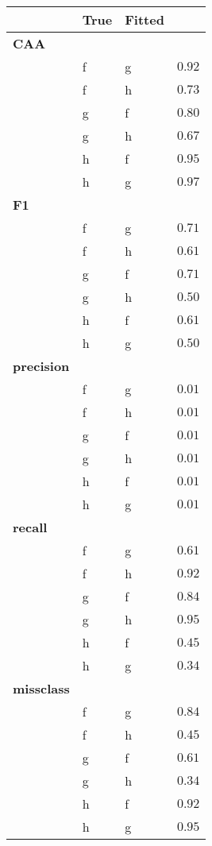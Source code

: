 \begin{table}[!tbp]
\begin{center}
\begin{tabular}{lllr}
\hline\hline
\multicolumn{1}{l}{}&\multicolumn{1}{c}{True}&\multicolumn{1}{c}{Fitted}&\multicolumn{1}{c}{}\tabularnewline
\hline
{\bfseries CAA}&&&\tabularnewline
~~&f&g&$0.92$\tabularnewline
~~&f&h&$0.73$\tabularnewline
~~&g&f&$0.80$\tabularnewline
~~&g&h&$0.67$\tabularnewline
~~&h&f&$0.95$\tabularnewline
~~&h&g&$0.97$\tabularnewline
\hline
{\bfseries F1}&&&\tabularnewline
~~&f&g&$0.71$\tabularnewline
~~&f&h&$0.61$\tabularnewline
~~&g&f&$0.71$\tabularnewline
~~&g&h&$0.50$\tabularnewline
~~&h&f&$0.61$\tabularnewline
~~&h&g&$0.50$\tabularnewline
\hline
{\bfseries precision}&&&\tabularnewline
~~&f&g&$0.01$\tabularnewline
~~&f&h&$0.01$\tabularnewline
~~&g&f&$0.01$\tabularnewline
~~&g&h&$0.01$\tabularnewline
~~&h&f&$0.01$\tabularnewline
~~&h&g&$0.01$\tabularnewline
\hline
{\bfseries recall}&&&\tabularnewline
~~&f&g&$0.61$\tabularnewline
~~&f&h&$0.92$\tabularnewline
~~&g&f&$0.84$\tabularnewline
~~&g&h&$0.95$\tabularnewline
~~&h&f&$0.45$\tabularnewline
~~&h&g&$0.34$\tabularnewline
\hline
{\bfseries missclass}&&&\tabularnewline
~~&f&g&$0.84$\tabularnewline
~~&f&h&$0.45$\tabularnewline
~~&g&f&$0.61$\tabularnewline
~~&g&h&$0.34$\tabularnewline
~~&h&f&$0.92$\tabularnewline
~~&h&g&$0.95$\tabularnewline
\hline
\end{tabular}\end{center}
\end{table}
